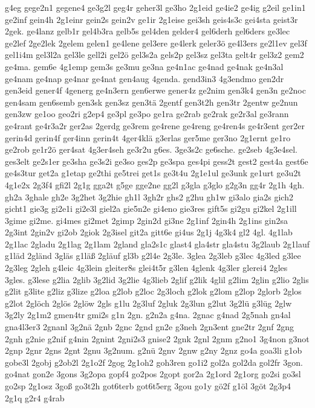 {g4eg
gege2n1
gegene4
ge3g2l
geg4r
geher3l
ge3ho
2g1eid
ge4ie2
ge4ig
g2eil
ge1in1
ge2inf
gein4h
2g1einr
gein2s
gein2v
ge1ir
2g1eise
gei3sh
geis4s3c
gei4sta
geist3r
2gek.
ge4lanz
gelb1r
gel4b3ra
gelb5s
gel4den
gelder4
gel6derh
gel6ders
ge3lec
ge2lef
2ge2lek
2gelem
gelen1
ge4lene
gel3ere
ge4lerk
geler3ö
ge4l3ers
ge2l1ev
gel3f
gel1i4m
gel3l2a
gel3le
gell2i
gel2ö
gel3s2a
gels2p
gel3sz
gel3ta
gelt4r
gel3z2
gem2
ge4ma.
gem6e
4g1emp
gem3s
ge3mu
ge3na
ge4n1ac
ge4nad
ge4nak
ge4n3al
ge4nam
ge4nap
ge4nar
ge4nat
gen4aug
4genda.
gend3in3
4g3endmo
gen2dr
gen3eid
gener4f
4generg
ge4n3ern
gen6erwe
gener4z
ge2nim
gen3k4
gen3n
ge2noc
gen4sam
gen6semb
gen3sk
gen3sz
gen3tä
2gentf
gen3t2h
gen3tr
2gentw
ge2nun
gen3zw
ge1oo
geo2ri
g2ep4
ge3pl
ge3po
ge1ra
ge2rab
ge2rak
ge2r3al
ge3rann
ge4rant
ge4r3a2r
ger2as
2gerdg
ge3rem
ge4rene
ge4reng
ge4ren4s
ge4r3ent
ger2er
gerin4d
gerin4f
ger4inn
gerin4t
4ger4klä
g3erlas
ger5me
ger3no
2g1ernt
ge1ro
ge2rob
ge1r2ö
ger4sat
4g3er4seh
ge3r2u
g6es.
3ge3s2c
ge6sche.
ge2seb
4g3e4sel.
ges3elt
ge2s1er
ge3sha
ge3s2i
ge3so
ges2p
ge3spa
ges4pi
gess2t
gest2
gest4a
gest6e
ge4s3tur
get2a
g1etap
ge2thi
ge5trei
get1s
ge3t4u
2g1e1ul
ge3unk
ge1urt
ge3u2t
4g1e2x
2g3f4
gfi2l
2g1g
gga2t
g5ge
gge2ne
gg2l
g3gla
g3glo
g2g3n
gg4r
2g1h
4gh.
gh2a
3ghale
gh2e
3g2het
3g2hie
gh1l
3gh2r
ghs2
g2hu
gh1w
gi3alo
gia2s
gich2
gicht1
gie3g
gi2e1i
gi2e3l
giel2a
gie5n2e
gi4eno
gie3res
gift5s
gi2gu
gi2kel
2g1ill
3gime
gi2me.
gi4mes
gi2met
2gimp
2gin2d
gi3ne
2g1inf
2gin4h
2g1ins
gin2sa
2g3int
2gin2v
gi2ob
2giok
2g3isel
git2a
gitt6e
gi4us
2g1j
4g3k4
gl2
4gl.
4g1lab
2g1lac
2gladu
2g1lag
2g1lam
2gland
gla2s1c
glast4
gla4str
gla4stu
3g2laub
2g1lauf
g1läd
2gländ
3gläs
g1läß
2gläuf
gl3b
g2l4e
2g3le.
3glea
2g3leb
g3lec
4g3led
g3lee
2g3leg
2gleh
g4leic
4g3lein
gleiter8s
glei4t5r
g3len
4glenk
4g3ler
glerei4
2gles
3gles.
g3lese
g2lia
2glib
3g2lid
3g2lie
4g3lieb
2glif
g2lik
4glil
g2lim
2glin
g2lio
2glis
g2lit
g3lite
g2liz
g3lize
g2loa
g2lob
g2loc
2g3loch
g2lok
g2lom
g2lop
2glorb
2glos
g2lot
2glöch
2glös
2glöw
2gls
g1lu
2g3luf
2gluk
2g3lun
g2lut
3g2lü
g3lüg
2glw
3g2ly
2g1m2
gmen4tr
gmi2s
g1n
2gn.
g2n2a
g4na.
2gnac
g4nad
2g5nah
gn4al
gna4l3er3
2gnanl
3g2nä
2gnb
2gnc
2gnd
gn2e
g3neh
2gn3ent
gne2tr
2gnf
2gng
2gnh
g2nie
g2nif
g4nin
2gnint
2gni2s3
gnise2
2gnk
2gnl
2gnm
g2no1
3g4non
g3not
2gnp
2gnr
2gns
2gnt
2gnu
3g2num.
g2nü
2gnv
2gnw
g2ny
2gnz
go4a
goa3li
g1ob
gobe3l
2gobj
g2ob2l
2g1o2f
2gog
2g1oh2
goh3ren
go1i2
gol2a
gol2da
gol2fr
3gon.
go4nat
gon2e
3gons
3g2opa
gopf4
go2pos
2gopt
gor2a
2g1ord
2g1org
go2si
go3sl
go2sp
2g1osz
3goß
go3t2h
got6terb
got6t5erg
3gou
go1y
gö2f
g1öl
3göt
2g3p4
2g1q
g2r4
g4rab
}
